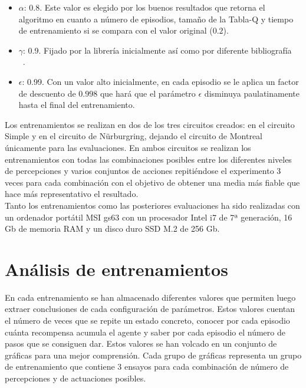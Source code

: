 \begin{itemize}
    \item \textbf{$\alpha$}: 0.8. Este valor es elegido por los buenos resultados que retorna el algoritmo en cuanto a número de episodios, tamaño de la Tabla-Q y tiempo de entrenamiento si se compara con el valor original ($0.2$).
    \item \textbf{$\gamma$}: 0.9. Fijado por la librería inicialmente así como por diferente bibliografía~\cite{oreily} ~\cite{pytorch_drl}.
    \item \textbf{$\epsilon$}: 0.99. Con un valor alto inicialmente, en cada episodio se le aplica un factor de descuento de $0.998$ que hará que el parámetro $\epsilon$ disminuya paulatinamente hasta el final del entrenamiento.\\
\end{itemize} 

Los entrenamientos se realizan en dos de los tres circuitos creados: en el circuito Simple y en el circuito de Nürburgring, dejando el circuito de Montreal únicamente para las evaluaciones. En ambos circuitos se realizan los entrenamientos con todas las combinaciones posibles entre los diferentes niveles de percepciones y varios conjuntos de acciones repitiéndose el experimento 3 veces para cada combinación con el objetivo de obtener una media más fiable que hace más representativo el resultado.\\

Tanto los entrenamientos como las posteriores evaluaciones ha sido realizadas con un ordenador portátil MSI gs63 con un procesador Intel i7 de 7ª generación, 16 Gb de memoria RAM y un disco duro SSD M.2 de 256 Gb.\\

\section{Análisis de entrenamientos}\label{analisis_entrenamientos}

En cada entrenamiento se han almacenado diferentes valores que permiten luego extraer conclusiones de cada configuración de parámetros. Estos valores cuentan el número de veces que se repite un estado concreto, conocer por cada episodio cuánta recompensa acumula el agente y saber por cada episodio el número de pasos que se consiguen dar. Estos valores se han volcado en un conjunto de gráficas para una mejor comprensión. Cada grupo de gráficas representa un grupo de entrenamiento que contiene 3 ensayos para cada combinación de número de percepciones y de actuaciones posibles.\\

